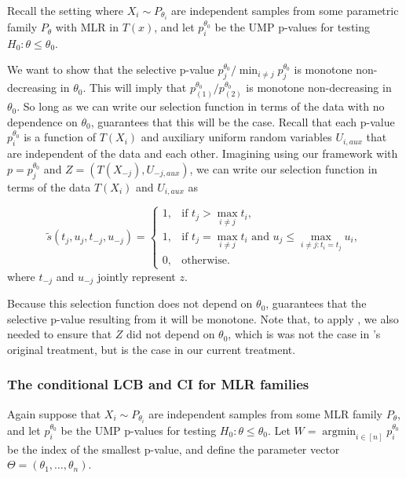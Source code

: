 \documentclass{article}
\DeclareMathOperator*{\argmin}{argmin}
\begin{document}
\begin{appendix}
Recall the setting where $X_i \sim P_{\theta_i}$ are independent samples from some parametric family $P_{\theta}$ with MLR in $T(x)$, and let $p^{\theta_0}_i$ be the UMP p-values for testing $H_0 : \theta \leq \theta_0$. 

We want to show that the selective p-value $p^{\theta_0}_j/\min_{i \neq j} p^{\theta_0}_j$ is monotone non-decreasing in $\theta_0$. This will imply that $p^{\theta_0}_{(1)}/p^{\theta_0}_{(2)}$ is monotone non-decreasing in $\theta_0$. So long as we can write our selection function in terms of the data with no dependence on $\theta_0$,  guarantees that this will be the case. Recall that each p-value $p^{\theta_0}_i$ is a function of $T(X_i)$ and auxiliary uniform random variables $U_{i, aux}$ that are independent of the data and each other. Imagining using our framework with $p=p^{\theta_0}_j$ and $Z=(T(X_{-j}), U_{-j, aux})$, we can write our selection function in terms of the data $T(X_i)$ and $U_{i, aux}$ as 

\begin{equation*}
    \tilde{s}(t_j, u_j, t_{-j}, u_{-j}) =
    \begin{cases} 
    1, & \text{if } t_j > \max_{i \neq j } t_i, \\
    1, & \text{if } t_j = \max_{i \neq j } t_i \text{ and } u_j \leq \max_{i \neq j : t_i = t_j} u_i, \\
    0, & \text{otherwise}.
\end{cases}
\end{equation*}
where $t_{-j}$ and $u_{-j}$ jointly represent $z$. 

Because this selection function does not depend on $\theta_0$,  guarantees that the selective p-value resulting from it will be monotone. Note that, to apply , we also needed to ensure that $Z$ did not depend on $\theta_0$, which is was not the case in 's original treatment, but is the case in our current treatment. 

\subsubsection{The conditional LCB and CI for MLR families}
Again suppose that $X_i \sim P_{\theta_i}$ are independent samples from some MLR family $P_{\theta}$, and let $p^{\theta_0}_i$ be the UMP p-values for testing $H_0 : \theta \leq \theta_0$. Let $W = \argmin_{i \in [n]} p^{\theta_0}_i$ be the index of the smallest p-value, and define the parameter vector $\Theta = (\theta_1, \dots, \theta_n)$. 


\end{appendix}
\end{document}
